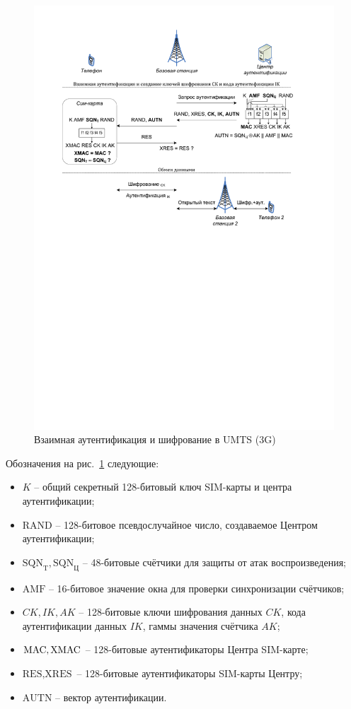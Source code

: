 \begin{figure}[!ht]
	\centering
	\includegraphics[width=\textwidth]{pic/gsm3}
	\caption{Взаимная аутентификация и шифрование в UMTS (3G)\label{fig:gsm3}}
\end{figure}

Обозначения на рис.~\ref{fig:gsm3} следующие:
\begin{itemize}
    \item $K$ -- общий секретный 128-битовый ключ SIM-карты и центра аутентификации;
    \item $\textrm{RAND}$ -- 128-битовое псевдослучайное число, создаваемое Центром аутентификации;
    \item $\textrm{SQN}_{\textrm{T}}, \textrm{SQN}_{\textrm{Ц}}$ -- 48-битовые счётчики для защиты от атак воспроизведения;
    \item $\textrm{AMF}$ -- 16-битовое значение окна для проверки синхронизации счётчиков;
    \item $CK, IK, AK$ -- 128-битовые ключи шифрования данных $CK$, кода аутентификации данных $IK$, гаммы значения счётчика $AK$;
    \item $\textrm{MAC}, \textrm{XMAC}$ -- 128-битовые аутентификаторы Центра SIM-карте;
    \item $\textrm{RES}, \textrm{XRES}$ -- 128-битовые аутентификаторы SIM-карты Центру;
    \item $\textrm{AUTN}$ -- вектор аутентификации.
\end{itemize}

